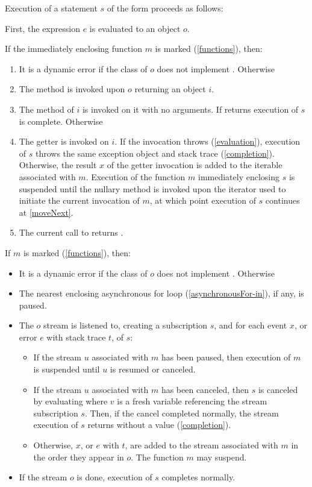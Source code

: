 \documentclass{article}
\begin{document}
\LMHash{}
Execution of a statement $s$ of the form  proceeds as follows:

\LMHash{}
First, the expression $e$ is evaluated to an object $o$.

\LMHash{}
If the immediately enclosing function $m$ is marked \SYNC* (\ref{functions}), then:
\begin{enumerate}
\item It is a dynamic error if the class of $o$ does not implement .
Otherwise
\item The method  is invoked upon $o$ returning an object $i$.
\item \label{moveNext} The  method of $i$ is invoked on it with no arguments.
If  returns \FALSE{} execution of $s$ is complete.
Otherwise
\item The getter  is invoked on $i$.
If the invocation throws (\ref{evaluation}), execution of $s$ throws the same exception object and stack trace (\ref{completion}).
Otherwise, the result $x$ of the getter invocation is added to the iterable associated with $m$.
Execution of the function $m$ immediately enclosing $s$ is suspended until the nullary method  is invoked upon the iterator used to initiate the current invocation of $m$, at which point execution of $s$ continues at \ref{moveNext}.
\item
The current call to  returns \TRUE.
\end{enumerate}

\LMHash{}
If $m$ is marked \ASYNC* (\ref{functions}), then:
\begin{itemize}
\item It is a dynamic error if the class of $o$ does not implement .
Otherwise
\item The nearest enclosing asynchronous for loop (\ref{asynchronousFor-in}), if any, is paused.
\item The $o$ stream is listened to, creating a subscription $s$, and for each event $x$, or error $e$ with stack trace $t$, of $s$:
\begin{itemize}
\item
If the stream $u$ associated with $m$ has been paused, then execution of $m$ is suspended until $u$ is resumed or canceled.
\item
If the stream $u$ associated with $m$ has been canceled,
then $s$ is canceled by evaluating  where $v$ is a fresh variable referencing the stream subscription $s$.
Then, if the cancel completed normally, the stream execution of $s$ returns without a value (\ref{completion}).
\item
Otherwise, $x$, or $e$ with $t$, are added to the stream associated with $m$ in the order they appear in $o$.
The function $m$ may suspend.
\end{itemize}
\item If the stream $o$ is done, execution of $s$ completes normally.
\end{itemize}
\end{document}

